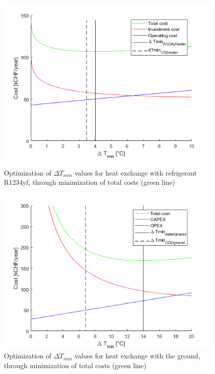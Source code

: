 \documentclass{article}
\begin{document}
\begin{figure}[!htb]
	\centering
	\begin{minipage}{.45\textwidth}
		\centering
		\includegraphics[width=\linewidth]{dtmin_wr}
		\caption{Optimization of $\Delta T_{min}$ values for heat exchange with refrigerant R1234yf, through minimization of total costs (green line)}
		\label{fig:dtmin_wr}
	\end{minipage}%
	\hspace{1cm}
	\begin{minipage}{0.45\textwidth}
		\centering
		\includegraphics[width=\linewidth]{dtmin_gtw}
		\caption{Optimization of $\Delta T_{min}$ values for heat exchange with the ground, through minimization of total costs (green line)}
		\label{fig:dtmin_gtw}
	\end{minipage}
\end{figure}
\end{document}
